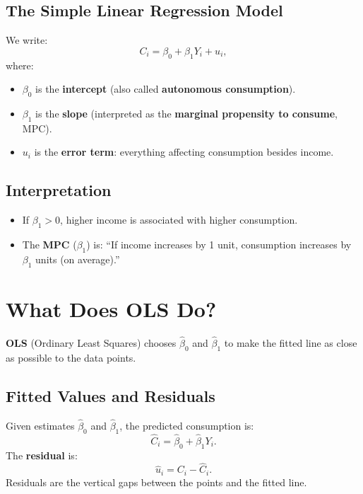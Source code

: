\documentclass[11pt]{article}
\newcommand{\bhat}{\widehat{\beta}}
\newcommand{\uhat}{\widehat{u}}
\begin{document}
\subsection*{The Simple Linear Regression Model}
We write:
\begin{equation}
C_i = \beta_0 + \beta_1 Y_i + u_i,
\end{equation}
where:
\begin{itemize}
  \item $\beta_0$ is the \textbf{intercept} (also called \textbf{autonomous consumption}).
  \item $\beta_1$ is the \textbf{slope} (interpreted as the \textbf{marginal propensity to consume}, MPC).
  \item $u_i$ is the \textbf{error term}: everything affecting consumption besides income.
\end{itemize}

\subsection*{Interpretation}
\begin{itemize}
  \item If $\beta_1 > 0$, higher income is associated with higher consumption.
  \item The \textbf{MPC} ($\beta_1$) is: ``If income increases by 1 unit, consumption increases by $\beta_1$ units (on average).'' 
\end{itemize}

\section*{What Does OLS Do?}
\textbf{OLS} (Ordinary Least Squares) chooses $\bhat_0$ and $\bhat_1$ to make the fitted line as close as possible to the data points.

\subsection*{Fitted Values and Residuals}
Given estimates $\bhat_0$ and $\bhat_1$, the predicted consumption is:
\begin{equation}
\widehat{C}_i = \bhat_0 + \bhat_1 Y_i.
\end{equation}
The \textbf{residual} is:
\begin{equation}
\uhat_i = C_i - \widehat{C}_i.
\end{equation}
Residuals are the vertical gaps between the points and the fitted line.
\end{document}
